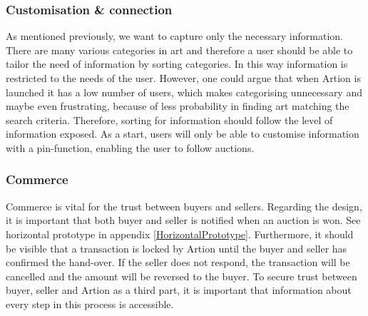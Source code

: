 \subsubsection*{Customisation \& connection}
As mentioned previously, we want to capture only the necessary information. There are many various categories in art and therefore a user should be able to tailor the need of information by sorting categories. In this way information is restricted to the needs of the user. However, one could argue that when Artion is launched it has a low number of users, which makes categorising unnecessary and maybe even frustrating, because of less probability in finding art matching the search criteria. Therefore, sorting for information should follow the level of information exposed. As a start, users will only be able to customise information with a pin-function, enabling the user to follow auctions.

\subsubsection*{Commerce}
Commerce is vital for the trust between buyers and sellers. Regarding the design, it is important that both buyer and seller is notified when an auction is won. See horizontal prototype in appendix \ref{HorizontalPrototype}. Furthermore, it should be visible that a transaction is locked by Artion until the buyer and seller has confirmed the hand-over. If the seller does not respond, the transaction will be cancelled and the amount will be reversed to the buyer. To secure trust between buyer, seller and Artion as a third part, it is important that information about every step in this process is accessible.